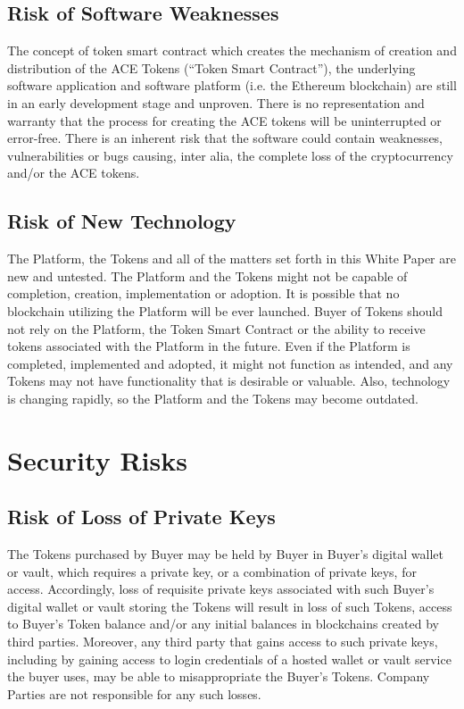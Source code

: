 \documentclass[12pt]{report}
\newcommand{\hlc}[1]{\colorbox{yellow!25}{#1}}
\begin{document}
\subsection{\hlc{Risk of Software Weaknesses}}
\label{risks-block-weaknesses}
The concept of token smart contract which creates the mechanism of creation and distribution of the ACE Tokens (“Token Smart Contract”), the underlying software application and software platform (i.e. the Ethereum blockchain) are still in an early development stage and unproven. There is no representation and warranty that the process for creating the ACE tokens will be uninterrupted or error-free. There is an inherent risk that the software could contain weaknesses, vulnerabilities or bugs causing, inter alia, the complete loss of the cryptocurrency and/or the ACE
tokens.

\subsection{Risk of New Technology}
The Platform, the Tokens and all of the matters set forth in this White Paper are new and untested. The Platform and the Tokens might not be capable of completion, creation, implementation or adoption. It is possible that no blockchain utilizing the Platform will be ever launched. Buyer of Tokens should not rely on the Platform,
the Token Smart Contract or the ability to receive tokens associated with the Platform in the future. Even if the Platform is completed, implemented and adopted, it might not function as intended, and any Tokens may not have functionality that is desirable or valuable. Also, technology is changing rapidly, so the Platform and the Tokens may become outdated.

\section{Security Risks}

\subsection{Risk of Loss of Private Keys}
The Tokens purchased by Buyer may be held by Buyer in Buyer’s digital wallet or vault, which requires a private key, or a combination of private keys, for access. Accordingly, loss of requisite private keys associated with such Buyer’s digital wallet or vault storing the Tokens will result in loss of such Tokens, access to Buyer’s Token balance and/or any initial balances in blockchains created by third parties. Moreover, any third party that gains access to such private keys, including by gaining access to login credentials of a hosted wallet or vault service the buyer uses, may
be able to misappropriate the Buyer’s Tokens. Company Parties are not responsible for any such losses.
\end{document}
